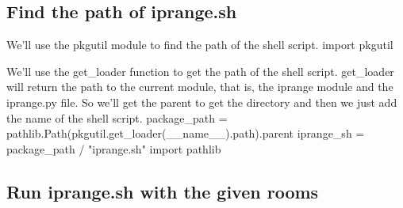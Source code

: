 \subsection{Find the path of {\Tt{}iprange.sh\nwendquote}}

We'll use the {\Tt{}pkgutil\nwendquote} module to find the path of the shell script.
\nwenddocs{}\endmoddef\nwstartdeflinemarkup{}\nwenddeflinemarkup
import pkgutil
\nwendcode{}\nwdocspar

We'll use the {\Tt{}get{\_}loader\nwendquote} function to get the path of the shell script.
{\Tt{}get{\_}loader\nwendquote} will return the path to the current module, that is, the 
{\Tt{}iprange\nwendquote} module and the {\Tt{}iprange.py\nwendquote} file.
So we'll get the parent to get the directory and then we just add the name of 
the shell script.
\nwenddocs{}\endmoddef\nwstartdeflinemarkup{}\nwenddeflinemarkup
package_path = pathlib.Path(pkgutil.get_loader(__name__).path).parent
iprange_sh = package_path / "iprange.sh"
\nwendcode{}\plusendmoddef\nwstartdeflinemarkup{}\nwenddeflinemarkup
import pathlib
\nwendcode{}\nwdocspar

\subsection{Run {\Tt{}iprange.sh\nwendquote} with the given {\Tt{}rooms\nwendquote}}

